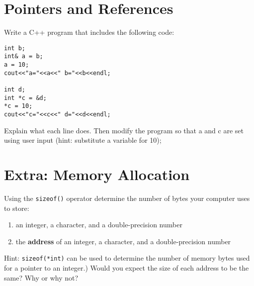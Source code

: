 \documentclass{article}
\begin{document}
\section*{Pointers and References}
Write a C++ program that includes the following code:
\begin{verbatim}
int b;
int& a = b;
a = 10;
cout<<"a="<<a<<" b="<<b<<endl;

int d;
int *c = &d;
*c = 10;
cout<<"c="<<c<<" d="<<d<<endl;
\end{verbatim}
Explain what each line does. Then modify the program so that a and c are set using user input (hint: substitute a variable for 10); 

\section*{Extra: Memory Allocation}
Using the \texttt{sizeof()} operator determine the number of bytes your computer uses to store:
\begin{enumerate}
	\item an integer, a character, and a double-precision number
	\item the \textbf{address} of an integer, a character, and a double-precision number
\end{enumerate}
Hint: \texttt{sizeof(*int)} can be used to determine the number of memory bytes used for a pointer to an integer.) Would you expect the size of each address to be the same? Why or why not?
\end{document}
